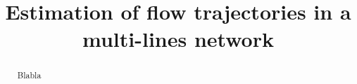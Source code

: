 \documentclass{bmcart}
\begin{document}
\begin{frontmatter}

\begin{fmbox}


\title{Estimation of flow trajectories in a multi-lines network}

\author[
  addressref={aff1},                   
  corref={aff1},                       
  email={gguex@unil.ch}
]{ }
\author[
  addressref={aff2},
  email={rloup@unil.ch}
]{ }
\author[
addressref={aff1, aff2},
email={fbavaud@unil.ch}
]{ }

\address[id=aff1]{%
  ,             
  ,          
  ,                              
}
\address[id=aff2]{%
  ,
  ,          
  ,                       
}

\end{fmbox}


\begin{abstractbox}

\begin{abstract} %
Blabla
\end{abstract}


\begin{keyword}
\end{keyword}


\end{abstractbox}

\end{frontmatter}




\end{document}
